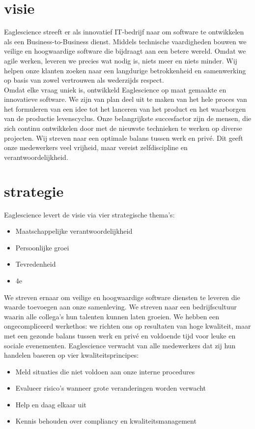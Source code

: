 \section{visie}\label{sec:visie}
Eaglescience streeft er als innovatief IT-bedrijf naar om software te ontwikkelen als een Business-to-Business dienst.
Middels technische vaardigheden bouwen we veilige en hoogwaardige software die bijdraagt aan een betere wereld.
Omdat we agile werken, leveren we precies wat nodig is, niets meer en niets minder.
Wij helpen onze klanten zoeken naar een langdurige betrokkenheid en samenwerking op basis van zowel vertrouwen als wederzijds respect. \\
Omdat elke vraag uniek is, ontwikkeld Eaglescience op maat gemaakte en innovatieve software.
We zijn van plan deel uit te maken van het hele proces van het formuleren van een idee tot het lanceren van het product en het waarborgen van de productie levenscyclus.
Onze belangrijkste succesfactor zijn de mensen, die zich continu ontwikkelen door met de nieuwste technieken te werken op diverse projecten.
Wij streven naar een optimale balans tussen werk en privé.
Dit geeft onze medewerkers veel vrijheid, maar vereist zelfdiscipline en verantwoordelijkheid.

\section{strategie}\label{sec:strategie}
Eaglescience levert de visie via vier strategische thema's:
\begin{itemize}
    \item Maatschappelijke verantwoordelijkheid
    \item Persoonlijke groei
    \item Tevredenheid
    \item 4e %
\end{itemize}
We streven ernaar om veilige en hoogwaardige software diensten te leveren die waarde toevoegen aan onze samenleving.
We streven naar een bedrijfscultuur waarin alle collega's hun talenten kunnen laten groeien.
We hebben een ongecompliceerd werkethos: we richten ons op resultaten van hoge kwaliteit, maar met een gezonde balans tussen werk en privé en voldoende tijd voor leuke en sociale evenementen.
Eaglescience verwacht van alle medewerkers dat zij hun handelen baseren op vier kwaliteitsprincipes:
\begin{itemize}
    \item Meld situaties die niet voldoen aan onze interne procedures
    \item Evalueer risico's wanneer grote veranderingen worden verwacht
    \item Help en daag elkaar uit
    \item Kennis behouden over compliancy en kwaliteitsmanagement
\end{itemize}

